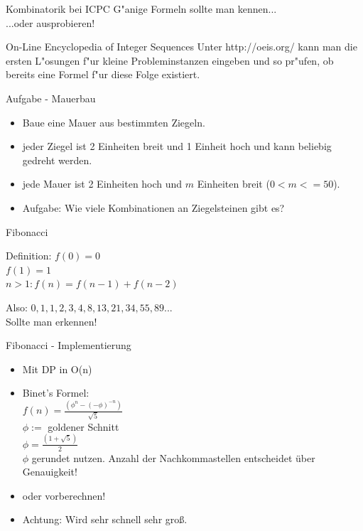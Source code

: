 \documentclass[18pt]{beamer}
\begin{document}
\begin{frame}{Kombinatorik bei ICPC}
G"anige Formeln sollte man kennen... \\
...oder ausprobieren! \\

\begin{block}{On-Line Encyclopedia of Integer Sequences}
Unter http://oeis.org/ kann man die ersten L"osungen f"ur kleine Probleminstanzen eingeben und so pr"ufen, ob bereits eine Formel f"ur diese Folge existiert.
\end{block}
\end{frame}


\begin{frame}{Aufgabe - Mauerbau}
\begin{itemize}
	\item Baue eine Mauer aus bestimmten Ziegeln.
	\item jeder Ziegel ist 2 Einheiten breit und 1 Einheit hoch und kann beliebig gedreht werden.
	\item jede Mauer ist 2 Einheiten hoch und \(m\) Einheiten breit (\(0<m<=50\)). 
	\item Aufgabe: Wie viele Kombinationen an Ziegelsteinen gibt es?
\end{itemize}
\end{frame}


\begin{frame}{Fibonacci}
\begin{block}{Definition:}
\(f(0)=0\)\\
\(f(1)=1\)\\
\(n>1: f(n)=f(n-1)+f(n-2)\)\\
\end{block}
Also: \(0, 1, 1, 2, 3, 4, 8, 13, 21, 34, 55, 89...\)\\

Sollte man erkennen!
\end{frame}


\begin{frame}{Fibonacci - Implementierung}
\begin{itemize}
\item Mit DP in O(n)
\item Binet's Formel: \\
\(f(n) = \frac{(\phi^{n} - (-\phi)^{-n}) }{ \sqrt{5}}\)\\
\(\phi :=\)  goldener Schnitt\\
\(\phi = \frac{ (1+\sqrt{5})}{2}\)\\
\(\phi\) gerundet nutzen. Anzahl der Nachkommastellen entscheidet über Genauigkeit!

\item oder vorberechnen!\\
\item Achtung: Wird sehr schnell sehr groß.
\end{itemize}
\end{frame}
\end{document}
